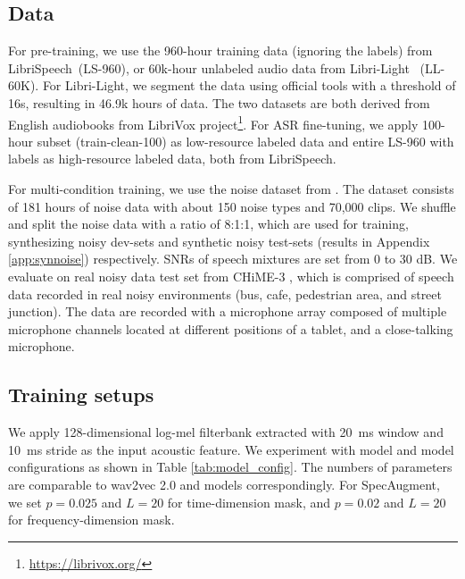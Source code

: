 \subsection{Data}

For pre-training, we use the 960-hour training data (ignoring the labels) from LibriSpeech~\citep{panayotov2015librispeech}(LS-960), or 60k-hour unlabeled audio data from Libri-Light~\citep{kahn2020libri} (LL-60K).
For Libri-Light, we segment the data using official tools with a threshold of 16s, resulting in 46.9k hours of data.
The two datasets are both derived from English audiobooks from LibriVox project\footnote{\url{https://librivox.org/}}.
For ASR fine-tuning, we apply 100-hour subset (train-clean-100) as low-resource labeled data and %
entire LS-960 with labels
as high-resource labeled data, both from LibriSpeech.

For multi-condition training, we use the noise dataset from \citet{ms_dns}. The dataset consists of 181 hours of noise data with about 150 noise types and 70,000 clips.
We shuffle and split the noise data with a ratio of 8:1:1, which are used for training, synthesizing noisy dev-sets and synthetic noisy test-sets (results in Appendix \ref{app:synnoise}) respectively. 
SNRs of speech mixtures are set from 0 to 30 dB. 
We evaluate on real noisy data test set from CHiME-3 \citep{Barker2015}, which is comprised of speech data recorded in real noisy environments (bus, cafe, pedestrian area, and street junction). The data are recorded with a microphone array composed of multiple microphone channels located at different positions of a tablet, and a close-talking microphone. %

\subsection{Training setups}

We apply 128-dimensional log-mel filterbank extracted with 20~ms window and 10~ms stride as the input acoustic feature.
We experiment with \tscbase{} model and \tscbig{} model configurations as shown in Table \ref{tab:model_config}. The numbers of parameters are comparable to wav2vec 2.0 \tscbase{} and \tscbig{} models correspondingly. 
For SpecAugment, we set $p=0.025$ and $L=20$ for time-dimension mask, and $p=0.02$ and $L=20$ for frequency-dimension mask.

